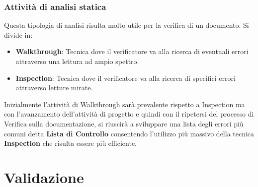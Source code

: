 \subsubsection{Attività di analisi statica}
Questa tipologia di analisi risulta molto utile per la verifica di un documento. Si divide in:
\begin{itemize}
  \item \textbf{Walkthrough}: Tecnica dove il verificatore va alla ricerca di eventuali errori attraverso una lettura ad ampio spettro.
  \item \textbf{Inspection}: Tecnica dove il verificatore va alla ricerca di specifici errori attraverso letture mirate.
\end{itemize}
Inizialmente l'attività di Walkthrough sarà prevalente rispetto a Inspection ma
con l'avanzamento dell'attività di progetto e quindi con il ripetersi del processo di Verifica sulla documentazione, si riuscirà a sviluppare una lista degli errori più comuni detta \textbf{Lista di Controllo} consentendo l'utilizzo più massivo della tecnica \textbf{Inspection} che risulta essere più efficiente.

\section{Validazione}
